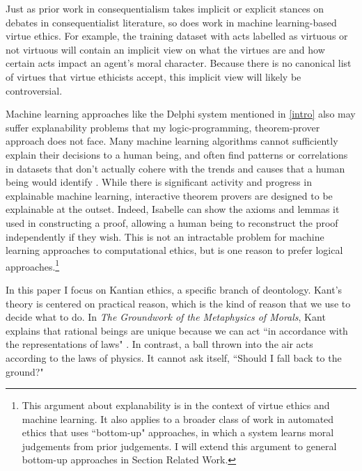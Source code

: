 \begin{isabellebody}
\begin{isamarkuptext}
Just as prior work in consequentialism takes implicit or explicit stances on debates in consequentialist
literature, so does work in machine learning-based virtue ethics. For example, the training 
dataset with acts labelled as virtuous or not virtuous will contain an implicit view on what the virtues
are and how certain acts impact an agent's moral character. Because there is no canonical list of virtues
that virtue ethicists accept, this implicit view will likely be controversial.

Machine learning approaches like the Delphi system \citep{delphi} mentioned in \ref{intro} also may suffer explanability 
problems that my logic-programming, theorem-prover
approach does not face. Many machine learning algorithms cannot sufficiently explain their 
decisions to a human being, and often find patterns or correlations in datasets that don't actually 
cohere with the trends and causes that a human being would identify \citep{puiutta}. While there is significant activity 
and progress in explainable machine learning, interactive theorem provers are designed to be explainable 
at the outset. Indeed, Isabelle can show the axioms and lemmas it used in constructing a proof, 
allowing a human being to reconstruct the proof independently if they wish. This is not an 
intractable problem for machine learning approaches to computational ethics, but is one reason to 
prefer logical approaches.\footnote{This argument about explanability is in the context of virtue ethics and 
machine learning. It also applies to a broader class of work in automated ethics 
that uses ``bottom-up" approaches, in which a system learns moral judgements from prior judgements. 
I will extend this argument to general bottom-up approaches in Section Related Work.}%
\end{isamarkuptext}\isamarkuptrue%
%
\isadelimdocument
%
\endisadelimdocument
%
\isatagdocument
%
\isamarkuptrue%
%
\endisatagdocument
{\isafolddocument}%
%
\isadelimdocument
%
\endisadelimdocument
%
\begin{isamarkuptext}%
In this paper I focus on Kantian ethics, a specific branch of deontology. Kant's theory is centered 
on practical reason, which is the kind of reason that we 
use to decide what to do. In \emph{The Groundwork of the Metaphysics of Morals}, Kant explains that 
rational beings are unique because we can act ``in accordance with 
the representations of laws" \citep[4:412]{groundwork}. In contrast, a ball thrown into the air acts 
according to the laws of physics. It cannot ask itself, ``Should I fall back to the ground?" 

\end{isamarkuptext}
\end{isabellebody}

